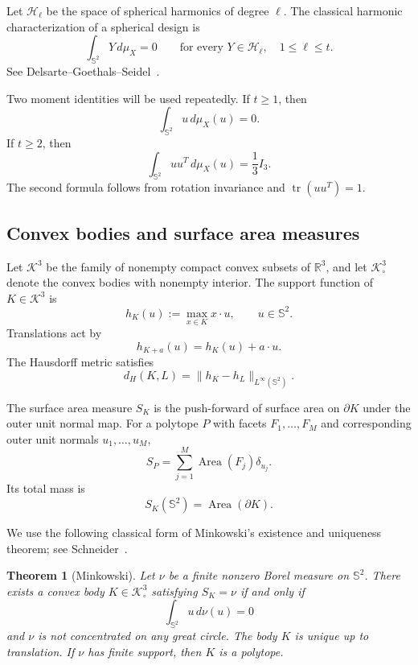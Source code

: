 \documentclass[11pt]{article}
\newtheorem{theorem}{Theorem}[section]
\theoremstyle{definition}
\theoremstyle{remark}
\newcommand{\Sph}{\mathbb S}
\newcommand{\R}{\mathbb R}
\newcommand{\K}{\mathcal K}
\newcommand{\Harm}{\mathcal H}
\newcommand{\Area}{\operatorname{Area}}
\newcommand{\tr}{\operatorname{tr}}
\begin{document}
Let $\Harm_\ell$ be the space of spherical harmonics of degree $\ell$. The classical harmonic characterization of a spherical design is
\begin{equation}\label{eq:harmonic-design}
\int_{\Sph^2}Y\,d\mu_X=0
\qquad\text{for every }Y\in\Harm_\ell,\quad 1\le\ell\le t.
\end{equation}
See Delsarte--Goethals--Seidel~\cite{DGS1977}.

Two moment identities will be used repeatedly. If $t\ge1$, then
\begin{equation}\label{eq:first-moment}
\int_{\Sph^2}u\,d\mu_X(u)=0.
\end{equation}
If $t\ge2$, then
\begin{equation}\label{eq:second-moment}
\int_{\Sph^2}uu^T\,d\mu_X(u)=\frac13 I_3.
\end{equation}
The second formula follows from rotation invariance and $\tr(uu^T)=1$.

\subsection{Convex bodies and surface area measures}
Let $\K^3$ be the family of nonempty compact convex subsets of $\R^3$, and let $\K^3_\circ$ denote the convex bodies with nonempty interior. The support function of $K\in\K^3$ is
\[
h_K(u):=\max_{x\in K}x\cdot u,\qquad u\in\Sph^2.
\]
Translations act by
\[
h_{K+a}(u)=h_K(u)+a\cdot u.
\]
The Hausdorff metric satisfies
\begin{equation}\label{eq:hausdorff-support}
d_H(K,L)=\|h_K-h_L\|_{L^\infty(\Sph^2)}.
\end{equation}

The surface area measure $S_K$ is the push-forward of surface area on $\partial K$ under the outer unit normal map. For a polytope $P$ with facets $F_1,\dots,F_M$ and corresponding outer unit normals $u_1,\dots,u_M$,
\begin{equation}\label{eq:polytope-SA}
S_P=\sum_{j=1}^M\Area(F_j)\delta_{u_j}.
\end{equation}
Its total mass is
\[
S_K(\Sph^2)=\Area(\partial K).
\]

We use the following classical form of Minkowski's existence and uniqueness theorem; see Schneider~\cite[Section~8.2]{Schneider2014}.

\begin{theorem}[Minkowski]\label{thm:minkowski}
Let $\nu$ be a finite nonzero Borel measure on $\Sph^2$. There exists a convex body $K\in\K^3_\circ$ satisfying $S_K=\nu$ if and only if
\begin{equation}\label{eq:minkowski-balance}
\int_{\Sph^2}u\,d\nu(u)=0
\end{equation}
and $\nu$ is not concentrated on any great circle. The body $K$ is unique up to translation. If $\nu$ has finite support, then $K$ is a polytope.
\end{theorem}
\end{document}
